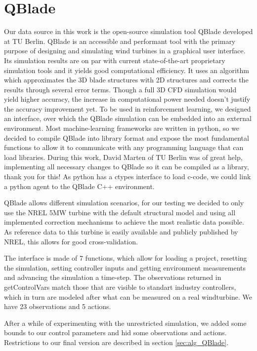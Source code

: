 \documentclass[hyperref,final,beleg]{cgvpub}
\begin{document}
\section{QBlade}
Our data source in this work is the open-source simulation tool QBlade \cite{martenQBLADEOPENSOURCE2013} developed at TU Berlin. QBlade is an accessible and performant tool with the primary purpose of designing and simulating wind turbines in a graphical user interface. Its simulation results are on par with current state-of-the-art proprietary simulation tools and it yields good computational efficiency. It uses an algorithm which approximates the 3D blade structures with 2D structures and corrects the results through several error terms. Though a full 3D CFD simulation would yield higher accuracy, the increase in computational power needed doesn't justify the accuracy improvement yet. To be used in reinforcement learning, we designed an interface, over which the QBlade simulation can be embedded into an external environment. Most machine-learning frameworks are written in python, so we decided to compile QBlade into library format and expose the most fundamental functions to allow it to communicate with any programming language that can load libraries. During this work, David Marten of TU Berlin was of great help, implementing all necessary changes to QBlade so it can be compiled as a library, thank you for this! As python has a ctypes interface to load c-code, we could link a python agent to the QBlade C++ environment.

QBlade allows different simulation scenarios, for our testing we decided to only use the NREL 5MW \cite{jonkmanDefinition5MWReference2009} turbine with the default structural model and using all implemented correction mechanisms to achieve the most realistic data possible. As reference data to this turbine is easily available and publicly published by NREL, this allows for good cross-validation.

The interface is made of 7 functions, which allow for loading a project, resetting the simulation, setting controller inputs and getting environment measurements and advancing the simulation a time-step. The observations returned in getControlVars match those that are visible to standart industry controllers, which in turn are modeled after what can be measured on a real windturbine. We have 23 observations and 5 actions.

After a while of experimenting with the unrestricted simulation, we added some bounds to our control parameters and hid some observations and actions. Restrictions to our final version are described in section \ref{sec:alg_QBlade}.
\end{document}
